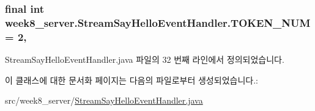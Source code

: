 \hypertarget{classweek8__server_1_1_stream_say_hello_event_handler_aa6b191144a3deebb3779ddad8a10850d}{
\subsubsection[{T\-O\-K\-E\-N\-\_\-\-N\-U\-M}]{\setlength{\rightskip}{0pt plus 5cm}final int week8\-\_\-server.\-Stream\-Say\-Hello\-Event\-Handler.\-T\-O\-K\-E\-N\-\_\-\-N\-U\-M = 2\hspace{0.3cm}{\ttfamily [static]}, {\ttfamily [private]}}}\label{classweek8__server_1_1_stream_say_hello_event_handler_aa6b191144a3deebb3779ddad8a10850d}


Stream\-Say\-Hello\-Event\-Handler.\-java 파일의 32 번째 라인에서 정의되었습니다.



이 클래스에 대한 문서화 페이지는 다음의 파일로부터 생성되었습니다.\-:\begin{DoxyCompactItemize}
\item 
src/week8\-\_\-server/\hyperlink{_stream_say_hello_event_handler_8java}{Stream\-Say\-Hello\-Event\-Handler.\-java}\end{DoxyCompactItemize}

